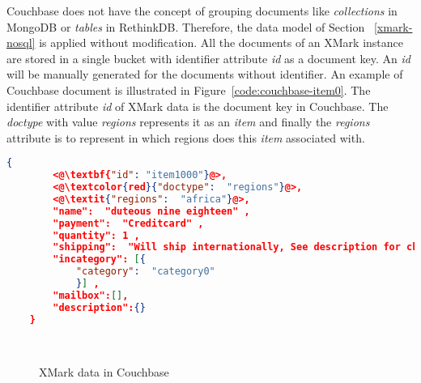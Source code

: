 Couchbase does not have the concept of grouping documents like \textit{collections} in MongoDB  or \textit{tables} in RethinkDB. 
Therefore, the data model of Section ~\ref{xmark-nosql} is applied without modification.
 All the documents of an XMark instance  are stored in a single bucket with identifier attribute \textit{id} as a document key. An \textit{id} will be manually generated for the documents without identifier.
An example of Couchbase document is illustrated in Figure~\ref{code:couchbase-item0}. The identifier attribute \textit{id}  of XMark data is the document key in Couchbase. The \textit{doctype} with  value \textit{regions} represents it as an \textit{item} and finally the \textit{regions} attribute is to represent in which regions does this \textit{item} associated with. 
\newbox\cbXmarkDocument
\begin{lrbox}{\cbXmarkDocument}
\begin{lstlisting}[language=JSON,  basicstyle =\scriptsize]
    {
    	<@\textbf{"id": "item1000"}@>,
    	<@\textcolor{red}{"doctype":  "regions"}@>,
    	<@\textit{"regions":  "africa"}@>,
    	"name":  "duteous nine eighteen" ,
    	"payment":  "Creditcard" ,
    	"quantity": 1 ,
    	"shipping":  "Will ship internationally, See description for charges" ,
    	"incategory": [{
    		"category":  "category0"
    		}] ,
    	"mailbox":[],
    	"description":{}
    }
\end{lstlisting} 
\end{lrbox}


\newbox\cbXmarkChart
\begin{lrbox}{\cbXmarkChart}
\end{lrbox}

\begin{figure}[hbtp]
\centering
{}
\\
\centering
{}

\caption{XMark data in Couchbase}
\label{xmark-cb-figure}
\end{figure}